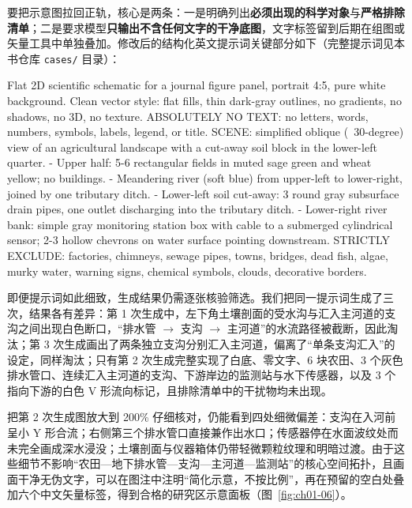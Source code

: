 要把示意图拉回正轨，核心是两条：一是明确列出\textbf{必须出现的科学对象}与\textbf{严格排除清单}；二是要求模型\textbf{只输出不含任何文字的干净底图}，文字标签留到后期在组图或矢量工具中单独叠加。修改后的结构化英文提示词关键部分如下（完整提示词见本书仓库 \texttt{cases/} 目录）：

\begin{Prompt}
Flat 2D scientific schematic for a journal figure panel, portrait 4:5, pure white
background. Clean vector style: flat fills, thin dark-gray outlines, no gradients,
no shadows, no 3D, no texture.
ABSOLUTELY NO TEXT: no letters, words, numbers, symbols, labels, legend, or title.
SCENE: simplified oblique (~30-degree) view of an agricultural landscape with a
cut-away soil block in the lower-left quarter.
- Upper half: 5-6 rectangular fields in muted sage green and wheat yellow; no buildings.
- Meandering river (soft blue) from upper-left to lower-right, joined by one tributary ditch.
- Lower-left soil cut-away: 3 round gray subsurface drain pipes, one outlet discharging
  into the tributary ditch.
- Lower-right river bank: simple gray monitoring station box with cable to a submerged
  cylindrical sensor; 2-3 hollow chevrons on water surface pointing downstream.
STRICTLY EXCLUDE: factories, chimneys, sewage pipes, towns, bridges, dead fish, algae,
murky water, warning signs, chemical symbols, clouds, decorative borders.
\end{Prompt}

即便提示词如此细致，生成结果仍需逐张核验筛选。我们把同一提示词生成了三次，结果各有差异：第 1 次生成中，左下角土壤剖面的受水沟与汇入主河道的支沟之间出现白色断口，“排水管 $\rightarrow$ 支沟 $\rightarrow$ 主河道”的水流路径被截断，因此淘汰；第 3 次生成画出了两条独立支沟分别汇入主河道，偏离了“单条支沟汇入”的设定，同样淘汰；只有第 2 次生成完整实现了白底、零文字、6 块农田、3 个灰色排水管口、连续汇入主河道的支沟、下游岸边的监测站与水下传感器，以及 3 个指向下游的白色 V 形流向标记，且排除清单中的干扰物均未出现。

把第 2 次生成图放大到 200\% 仔细核对，仍能看到四处细微偏差：支沟在入河前呈小 Y 形合流；右侧第三个排水管口直接兼作出水口；传感器停在水面波纹处而未完全画成深水浸没；土壤剖面与仪器箱体仍带轻微颗粒纹理和明暗过渡。由于这些细节不影响“农田—地下排水管—支沟—主河道—监测站”的核心空间拓扑，且画面干净无伪文字，可以在图注中注明“简化示意，不按比例”，再在预留的空白处叠加六个中文矢量标签，得到合格的研究区示意面板（图~\ref{fig:ch01-06}）。

